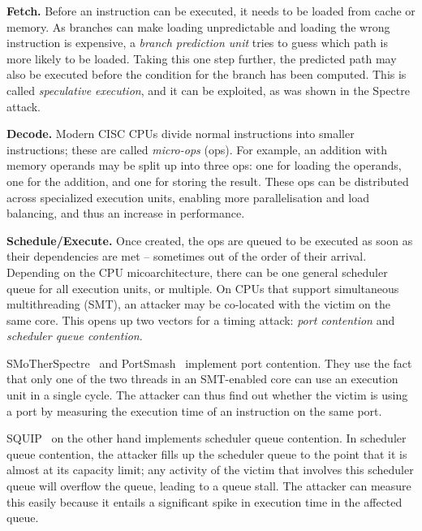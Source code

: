 \documentclass[11pt,
  titlepage=false,
]{scrreprt}
\begin{document}
\textbf{Fetch.}
Before an instruction can be executed, it needs to be loaded from cache or memory.
As branches can make loading unpredictable and loading the wrong instruction is expensive, a \textit{branch prediction unit} tries to guess which path is more likely to be loaded.
Taking this one step further, the predicted path may also be executed before the condition for the branch has been computed.
This is called \textit{speculative execution}\cite{AMD2020OptimizationEPYC7002}, and it can be exploited, as was shown in the Spectre~\cite{spKocherHFGGHHLM019} attack.

\textbf{Decode.}
Modern CISC CPUs divide normal instructions into smaller instructions;
these are called \textit{micro-ops} (\textmu ops)\cite{AMD2020OptimizationEPYC7002}.
For example, an addition with memory operands may be split up into three \textmu ops: one for loading the operands, one for the addition, and one for storing the result.
These \textmu ops can be distributed across specialized execution units, enabling more parallelisation and load balancing, and thus an increase in performance.

\textbf{Schedule/Execute.}
Once created, the \textmu ops are queued to be executed as soon as their dependencies are met -- sometimes out of the order of their arrival.
Depending on the CPU micoarchitecture, there can be one general scheduler queue for all execution units, or multiple.
On CPUs that support simultaneous multithreading (SMT), an attacker may be co-located with the victim on the same core.
This opens up two vectors for a timing attack: \textit{port contention} and \textit{scheduler queue contention}.

SMoTherSpectre~\cite{Bhattacharyya2019} and PortSmash~\cite{Aldaya2019port} implement port contention.
They use the fact that only one of the two threads in an SMT-enabled core can use an execution unit in a single cycle.
The attacker can thus find out whether the victim is using a port by measuring the execution time of an instruction on the same port.

SQUIP~\cite{squip} on the other hand implements scheduler queue contention.
In scheduler queue contention, the attacker fills up the scheduler queue to the point that it is almost at its capacity limit;
any activity of the victim that involves this scheduler queue will overflow the queue, leading to a queue stall.
The attacker can measure this easily because it entails a significant spike in execution time in the affected queue.
\end{document}
